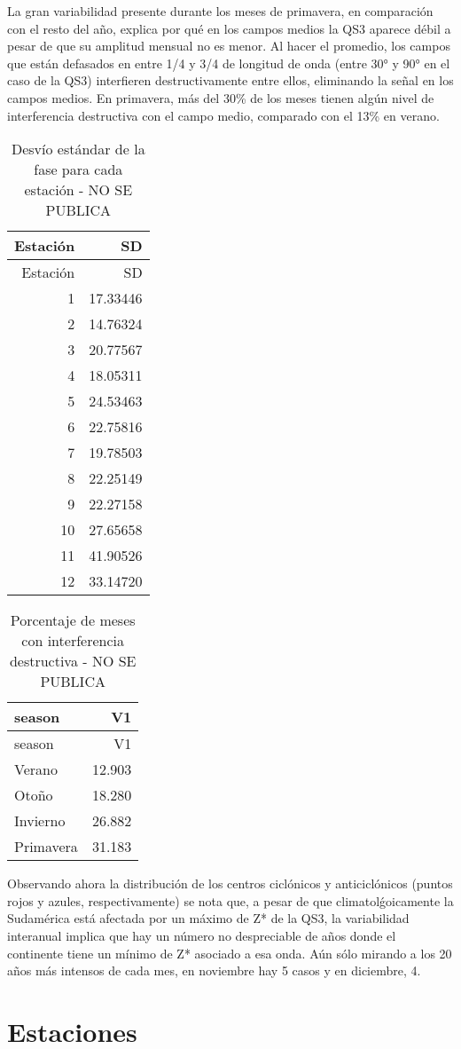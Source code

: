 \documentclass[spanish,a4paper]{book}
\begin{document}
La gran variabilidad presente durante los meses de primavera, en
comparación con el resto del año, explica por qué en los campos medios
la QS3 aparece débil a pesar de que su amplitud mensual no es menor. Al
hacer el promedio, los campos que están defasados en entre 1/4 y 3/4 de
longitud de onda (entre 30° y 90° en el caso de la QS3) interfieren
destructivamente entre ellos, eliminando la señal en los campos medios.
En primavera, más del 30\% de los meses tienen algún nivel de
interferencia destructiva con el campo medio, comparado con el 13\% en
verano.

\begin{longtable}[]{@{}rr@{}}
\caption{Desvío estándar de la fase para cada estación - NO SE
PUBLICA}\tabularnewline
\toprule
Estación & SD\tabularnewline
\midrule
\endfirsthead
\toprule
Estación & SD\tabularnewline
\midrule
\endhead
1 & 17.33446\tabularnewline
2 & 14.76324\tabularnewline
3 & 20.77567\tabularnewline
4 & 18.05311\tabularnewline
5 & 24.53463\tabularnewline
6 & 22.75816\tabularnewline
7 & 19.78503\tabularnewline
8 & 22.25149\tabularnewline
9 & 22.27158\tabularnewline
10 & 27.65658\tabularnewline
11 & 41.90526\tabularnewline
12 & 33.14720\tabularnewline
\bottomrule
\end{longtable}

\begin{longtable}[]{@{}lr@{}}
\caption{Porcentaje de meses con interferencia destructiva - NO SE
PUBLICA}\tabularnewline
\toprule
season & V1\tabularnewline
\midrule
\endfirsthead
\toprule
season & V1\tabularnewline
\midrule
\endhead
Verano & 12.903\tabularnewline
Otoño & 18.280\tabularnewline
Invierno & 26.882\tabularnewline
Primavera & 31.183\tabularnewline
\bottomrule
\end{longtable}

Observando ahora la distribución de los centros ciclónicos y
anticiclónicos (puntos rojos y azules,
respectivamente)
se nota que, a pesar de que climatolǵoicamente la Sudamérica está
afectada por un máximo de Z* de la QS3, la variabilidad interanual
implica que hay un número no despreciable de años donde el continente
tiene un mínimo de Z* asociado a esa onda. Aún sólo mirando a los 20
años más intensos de cada mes, en noviembre hay 5 casos y en diciembre,
4.

\section{Estaciones}\label{estaciones}
\end{document}
